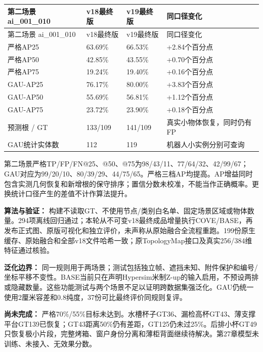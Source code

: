 \documentclass[UTF8,fontset=fandol]{ctexart}
\begin{document}
{\small
\begin{longtable}{|p{}|p{}|p{}|p{}|}
\hline
第二场景 ai\_001\_010 & v18最终版 & v19最终版 & 同口径变化 \\ \hline
\endfirsthead
\hline
第二场景 ai\_001\_010 & v18最终版 & v19最终版 & 同口径变化 \\ \hline
\endhead
严格AP25 & 63.69\% & 66.53\% & +2.84个百分点 \\ \hline
严格AP50 & 42.85\% & 43.55\% & +0.70个百分点 \\ \hline
严格AP75 & 19.24\% & 19.40\% & +0.16个百分点 \\ \hline
GAU-AP25 & 76.17\% & 80.00\% & +3.83个百分点 \\ \hline
GAU-AP50 & 55.69\% & 56.81\% & +1.12个百分点 \\ \hline
GAU-AP75 & 23.72\% & 23.90\% & +0.18个百分点 \\ \hline
预测根 / GT & 133/109 & 141/109 & 真实小物体恢复，同时仍有FP \\ \hline
GAU统计实体数 & 112 & 119 & 机器人小实例分别可查询 \\ \hline
\end{longtable}
}

第二场景严格TP/FP/FN@25、@50、@75为98/43/11、77/64/32、42/99/67；GAU对应为99/20/10、80/39/29、44/75/65。严格三档AP均提高。AP增益同时包含实测几何恢复和新增根的保守排序；置信分数未校准，不能当作正确概率。更换统计口径产生的差值不计作算法提升。



\textbf{算法与验证：} 构建不读取GT、不使用节点/类别白名单、固定场景区域或物体数量。294项离线回归通过；本轮从不可变v18最终成品增量执行COVE/BASE，再发布正式图、原版可视化和独立评价，未声称从原始融合全流程重跑。199份原生缓存、原始融合和全部v18文件哈希一致；原TopologyMap接口及真实256/384维特征通过核验。



\textbf{泛化边界：} 同一规则用于两场景；测试包括独立帧、遮挡未知、附件保护和编号/坐标平移不变性。BASE当前只在声明Hypersim米制Z-up的输入启用，不预设两排或隐藏数量。这些功能测试与两个场景不足以证明跨数据集强泛化。GAU仍统一使用2厘米容差和0.8纯度，37份可比最终评价同规则复评。



\textbf{尚未完成：} 严格70\%/55\%目标未达到。水槽杯子GT36、漏检高杯GT43、薄支撑平台GT139已恢复；GT43距离50\%仍有差距，GT125仍未过25\%。后排小杯GT49只恢复极小片段，完整烤箱、窗户身份分离和薄柜背面继续待解决。第27章模型未训练、未接入、无效果分数。
\end{document}
